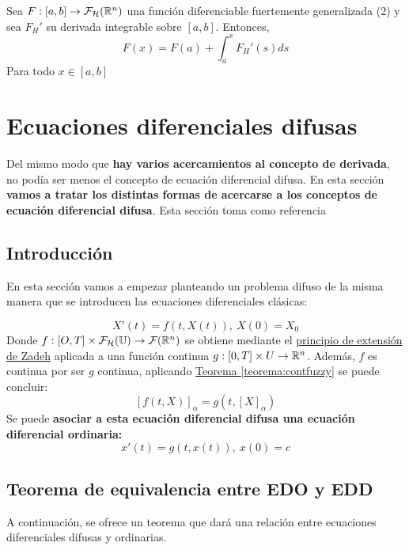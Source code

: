 \begin{teorema}
  Sea $F : [a, b] \rightarrow  \mathcal{F}_\mathcal{H} (\mathbb R^n)$ una función diferenciable fuertemente generalizada (2) y sea $F_H'$ su derivada integrable sobre $[a, b]$. Entonces,
  \[
  F(x) = F(a) + \int_{a}^{x}F_H'(s) ds
  \]
  Para todo $x \in [a, b]$
\end{teorema}

\section{Ecuaciones diferenciales difusas}
Del mismo modo que \textbf{hay varios acercamientos al concepto de derivada}, no podía ser menos el concepto de ecuación diferencial difusa. En esta sección \textbf{vamos a tratar los distintas formas de acercarse a los conceptos de ecuación diferencial difusa}. Esta sección toma como referencia \cite{fuzzyapproaches}

\subsection{Introducción}
En esta sección vamos a empezar planteando un problema difuso de la misma manera que se introducen las ecuaciones diferenciales clásicas:

\begin{equation}
  \label{def:edf}
  X'(t) = f(t, X(t)), ~ X(0) = X_0
\end{equation}
Donde $f : [O, T] \times \mathcal{F}_\mathcal{H}(\mathbb U) \rightarrow \mathcal{F}(\mathbb R^n)$ se obtiene mediante el \hyperref[def:zadeh]{principio de extensión de Zadeh} aplicada a una función continua $g : [0, T] \times U \rightarrow \mathbb R^n$. Además, $f$  es continua por ser $g$ continua, aplicando \hyperref[teorema:contfuzzy]{Teorema \ref*{teorema:contfuzzy}} se puede concluir:
\[
	[f(t, X)]_\alpha = g(t, [X]_\alpha)
\]
Se puede \textbf{asociar a esta ecuación diferencial difusa una ecuación diferencial ordinaria:}
\begin{equation}
	\label{eq:edo}
	x'(t) = g(t, x(t)), ~ x(0) = c
\end{equation}

\subsection{Teorema de equivalencia entre EDO y EDD}

A continuación, se ofrece un teorema que dará una relación entre ecuaciones diferenciales difusas y ordinarias.

